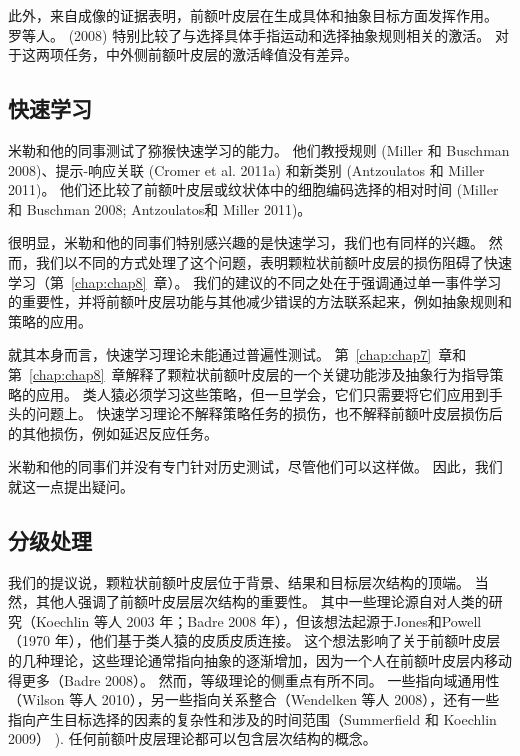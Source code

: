 此外，来自成像的证据表明，前额叶皮层在生成具体和抽象目标方面发挥作用。 罗等人。 (2008) 特别比较了与选择具体手指运动和选择抽象规则相关的激活。 对于这两项任务，中外侧前额叶皮层的激活峰值没有差异。



\subsection{快速学习}

米勒和他的同事测试了猕猴快速学习的能力。
他们教授规则 (Miller 和 Buschman 2008)、提示-响应关联 (Cromer et al. 2011a) 和新类别 (Antzoulatos 和 Miller 2011)。
他们还比较了前额叶皮层或纹状体中的细胞编码选择的相对时间 (Miller和 Buschman 2008; Antzoulatos和 Miller 2011)。
\par


很明显，米勒和他的同事们特别感兴趣的是快速学习，我们也有同样的兴趣。
然而，我们以不同的方式处理了这个问题，表明颗粒状前额叶皮层的损伤阻碍了快速学习（第~\ref{chap:chap8}~章）。
我们的建议的不同之处在于强调通过单一事件学习的重要性，并将前额叶皮层功能与其他减少错误的方法联系起来，例如抽象规则和策略的应用。
\par


就其本身而言，快速学习理论未能通过普遍性测试。
第~\ref{chap:chap7}~章和第~\ref{chap:chap8}~章解释了颗粒状前额叶皮层的一个关键功能涉及抽象行为指导策略的应用。
类人猿必须学习这些策略，但一旦学会，它们只需要将它们应用到手头的问题上。
快速学习理论不解释策略任务的损伤，也不解释前额叶皮层损伤后的其他损伤，例如延迟反应任务。
\par


米勒和他的同事们并没有专门针对历史测试，尽管他们可以这样做。
因此，我们就这一点提出疑问。




\subsection{分级处理}

我们的提议说，颗粒状前额叶皮层位于背景、结果和目标层次结构的顶端。
当然，其他人强调了前额叶皮层层次结构的重要性。
其中一些理论源自对人类的研究（Koechlin 等人 2003 年；Badre 2008 年），但该想法起源于Jones和Powell（1970 年），他们基于类人猿的皮质皮质连接。
这个想法影响了关于前额叶皮层的几种理论，这些理论通常指向抽象的逐渐增加，因为一个人在前额叶皮层内移动得更多（Badre 2008）。
然而，等级理论的侧重点有所不同。 一些指向域通用性（Wilson 等人 2010），另一些指向关系整合（Wendelken 等人 2008），还有一些指向产生目标选择的因素的复杂性和涉及的时间范围（Summerfield 和 Koechlin 2009） ). 任何前额叶皮层理论都可以包含层次结构的概念。
\par



